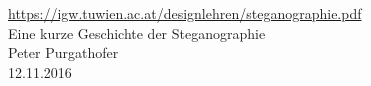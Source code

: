 

\href{https://igw.tuwien.ac.at/designlehren/steganographie.pdf}{https://igw.tuwien.ac.at/designlehren/steganographie.pdf} \\
Eine kurze Geschichte der Steganographie \\ 
Peter Purgathofer \\
12.11.2016